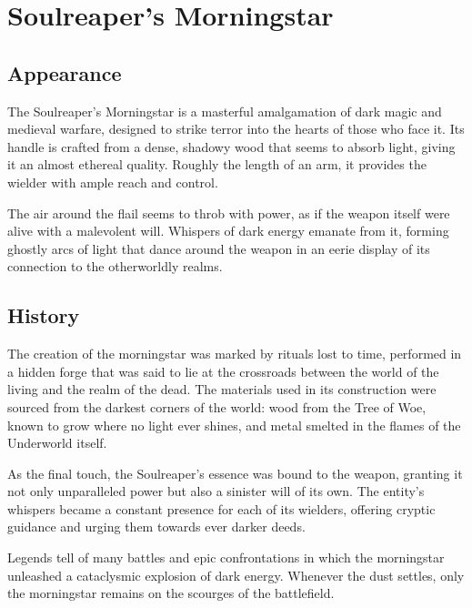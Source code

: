 
\chapter*{Soulreaper's Morningstar}

\section*{Appearance}
The Soulreaper's Morningstar is a masterful amalgamation of dark magic and medieval warfare, designed to strike terror into the hearts of those who face it. Its handle is crafted from a dense, shadowy wood that seems to absorb light, giving it an almost ethereal quality. Roughly the length of an arm, it provides the wielder with ample reach and control.

The air around the flail seems to throb with power, as if the weapon itself were alive with a malevolent will. Whispers of dark energy emanate from it, forming ghostly arcs of light that dance around the weapon in an eerie display of its connection to the otherworldly realms.

\section*{History}
The creation of the morningstar was marked by rituals lost to time, performed in a hidden forge that was said to lie at the crossroads between the world of the living and the realm of the dead. The materials used in its construction were sourced from the darkest corners of the world: wood from the Tree of Woe, known to grow where no light ever shines, and metal smelted in the flames of the Underworld itself.

As the final touch, the Soulreaper's essence was bound to the weapon, granting it not only unparalleled power but also a sinister will of its own. The entity's whispers became a constant presence for each of its wielders, offering cryptic guidance and urging them towards ever darker deeds.

Legends tell of many battles and epic confrontations in which the morningstar unleashed a cataclysmic explosion of dark energy. Whenever the dust settles, only the morningstar remains on the scourges of the battlefield.

